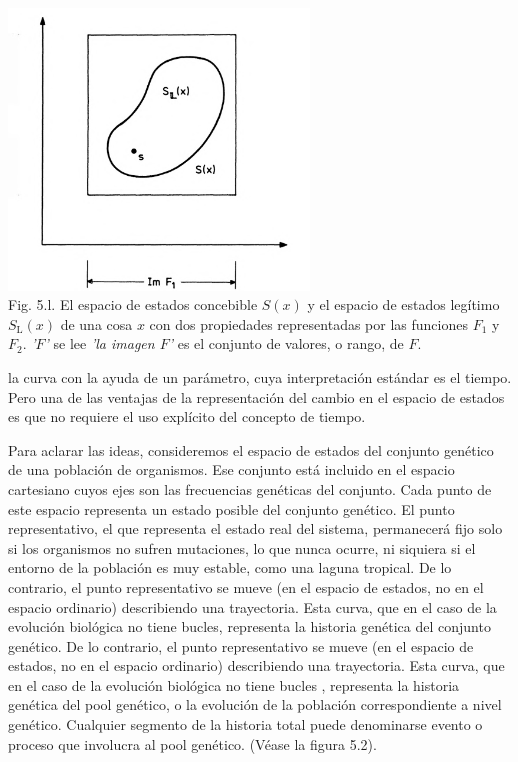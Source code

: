 \begin{justifying}
	\begin{center}
		\includegraphics[width=0.6\textwidth]{img/Figura5-1.png}
		\\ \scriptsize Fig. 5.l. El espacio de estados concebible $S(x)$ y el espacio de estados legítimo $S_\mathrm{L}(x)$ de una cosa $x$
		con dos propiedades representadas por las funciones $F_\mathrm{1}$ y $F_\mathrm{2}$.
		\textit{'$F$'} se lee \textit{'la imagen $F$'} es el conjunto de valores, o rango, de $F$.
	\end{center}


	\noindent la curva con la ayuda de un parámetro, cuya interpretación estándar es el tiempo.
	Pero una de las ventajas de la representación del cambio en el espacio de estados
	es que no requiere el uso explícito del concepto de tiempo.

	Para aclarar las ideas, consideremos el espacio de estados del conjunto genético de una población
	de organismos. Ese conjunto está incluido en el espacio cartesiano cuyos ejes son
	las frecuencias genéticas del conjunto. Cada punto de este espacio representa un estado posible del conjunto genético. El punto representativo, el que representa el estado real del sistema, permanecerá fijo solo si los organismos no sufren mutaciones, lo que nunca ocurre, ni siquiera si el entorno de la población es muy estable, como una laguna tropical.
	De lo contrario, el punto representativo se mueve (en el espacio de estados, no en el espacio ordinario) describiendo una trayectoria. Esta curva, que en el caso de la evolución biológica no tiene bucles, representa la historia genética del conjunto genético.
	De lo contrario, el punto representativo se mueve (en el espacio de estados, no en el espacio ordinario)
	describiendo una trayectoria. Esta curva, que en el caso de la
	evolución biológica no tiene bucles , representa la historia genética del
	pool genético, o la evolución de la población correspondiente a nivel genético.
	Cualquier segmento de la historia total puede denominarse evento o
	proceso que involucra al pool genético. (Véase la figura 5.2).


\end{justifying}
